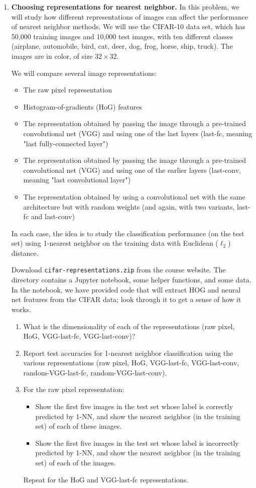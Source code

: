 \documentclass{article}
\begin{document}
\begin{enumerate}
\item \textbf{Choosing representations for nearest neighbor.} In this problem, we will study how different representations of images can affect the performance of nearest neighbor methods. We will use the CIFAR-10 data set, which has 50,000 training images and 10,000 test images, with ten different classes (airplane, automobile, bird, cat, deer, dog, frog, horse, ship, truck). The images are in color, of size $32 \times 32$.

    We will compare several image representations:
    \begin{itemize}
    \item The raw pixel representation
    \item Histogram-of-gradients (HoG) features
    \item The representation obtained by passing the image through a pre-trained convolutional net (VGG) and using one of the last layers (last-fc, meaning "last fully-connected layer")
    \item The representation obtained by passing the image through a pre-trained convolutional net (VGG) and using one of the earlier layers (last-conv, meaning "last convolutional layer")
    \item The representation obtained by using a convolutional net with the same architecture but with random weights (and again, with two variants, last-fc and last-conv)
    \end{itemize}

    In each case, the idea is to study the classification performance (on the test set) using 1-nearest neighbor on the training data with Euclidean ($\ell_{2}$) distance.

    Download \texttt{cifar-representations.zip} from the course website. The directory contains a Jupyter notebook, some helper functions, and some data. In the notebook, we have provided code that will extract HOG and neural net features from the CIFAR data; look through it to get a sense of how it works.
    \begin{enumerate}
    \item What is the dimensionality of each of the representations (raw pixel, HoG, VGG-last-fc, VGG-last-conv)?
    \item Report test accuracies for 1-nearest neighbor classification using the various representations (raw pixel, HoG, VGG-last-fc, VGG-last-conv, random-VGG-last-fc, random-VGG-last-conv).
    \item For the raw pixel representation:
        \begin{itemize}
        \item Show the first five images in the test set whose label is correctly predicted by 1-NN, and show the nearest neighbor (in the training set) of each of these images.
        \item Show the first five images in the test set whose label is incorrectly predicted by 1-NN, and show the nearest neighbor (in the training set) of each of the images.
        \end{itemize}
        Repeat for the HoG and VGG-last-fc representations.
    \end{enumerate}


\end{enumerate}
\end{document}
